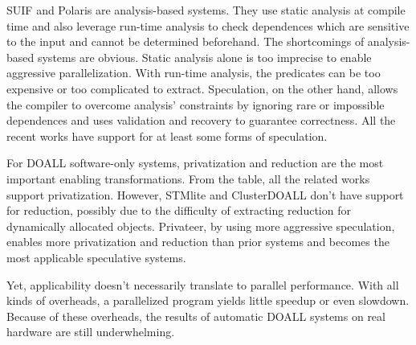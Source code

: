 SUIF and Polaris are analysis-based systems. They use static analysis at
compile time and also leverage run-time analysis to check dependences which
are sensitive to the input and cannot be determined beforehand.
%
The shortcomings of analysis-based systems are obvious. Static analysis
alone is too imprecise to enable aggressive parallelization. With run-time
analysis, the predicates can be too expensive or too complicated to
extract.
%
Speculation, on the other hand, allows the compiler to overcome analysis'
constraints by ignoring rare or impossible dependences and uses validation
and recovery to guarantee correctness. All the recent works have support
for at least some forms of speculation.

For DOALL software-only systems, privatization and reduction are the most
important enabling transformations. From the table, all the related works
support privatization. However, STMlite and ClusterDOALL don't have support
for reduction, possibly due to the difficulty of extracting reduction for
dynamically allocated objects. Privateer, by using more aggressive
speculation, enables more privatization and reduction than prior systems
and becomes the most applicable speculative systems.

Yet, applicability doesn't necessarily translate to parallel performance.
With all kinds of overheads, a parallelized program yields little speedup
or even slowdown. Because of these overheads, the results of automatic
DOALL systems on real hardware are still underwhelming.








